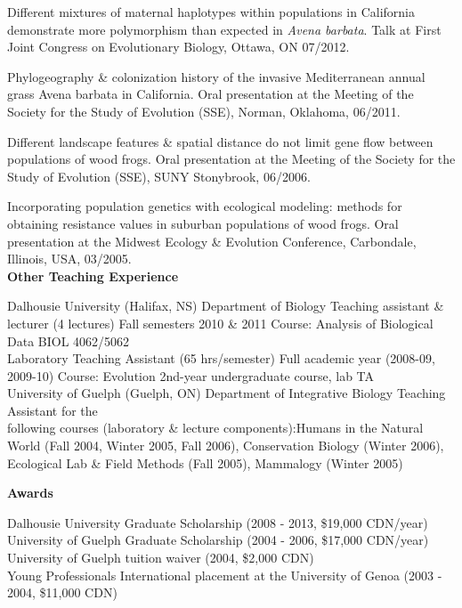 \documentclass[a4paper,12pt,final]{memoir}
\newcommand{\Sep}{\vspace{1.5em}}
\newcommand{\SmallSep}{\vspace{0.5em}}
\newenvironment{Contact Information}
	{\ignorespaces\textbf{\color{MidnightBlue} Contact Information}}
	{\Sep\ignorespacesafterend}
\newcommand{\CVSection}[1]
	{\Large\textbf{#1}\par
	\SmallSep\normalsize\normalfont}
\begin{document}
Different mixtures of maternal haplotypes within populations in California demonstrate more polymorphism than expected in \textit{Avena barbata}. Talk at First Joint Congress on Evolutionary Biology, Ottawa, ON 07/2012.
\SmallSep

Phylogeography \& colonization history of the invasive Mediterranean annual grass Avena barbata in California. Oral presentation at the Meeting of the Society for the Study of Evolution (SSE), Norman, Oklahoma, 06/2011.
\SmallSep

Different landscape features \& spatial distance do not limit gene flow between populations of wood frogs. Oral presentation at the Meeting of the Society for the Study of Evolution (SSE), SUNY Stonybrook, 06/2006.
\SmallSep

Incorporating population genetics with ecological modeling: methods for obtaining resistance values in suburban populations of wood frogs. Oral presentation at the Midwest Ecology \& Evolution Conference, Carbondale, Illinois, USA, 03/2005.\\


\CVSection{Other Teaching Experience}
Dalhousie University (Halifax, NS)
Department of Biology
Teaching assistant \& lecturer (4 lectures)
Fall semesters 2010 \& 2011
Course: Analysis of Biological Data BIOL 4062/5062\\ 

Laboratory Teaching Assistant (65 hrs/semester)
Full academic year (2008-09, 2009-10)
Course: Evolution 
2nd-year undergraduate course, lab TA\\ 

University of Guelph (Guelph, ON)
Department of Integrative Biology 
Teaching Assistant for the\\ following courses (laboratory \& lecture components):Humans in the Natural World (Fall 2004, Winter 2005, Fall 2006), Conservation Biology (Winter 2006), Ecological Lab \& Field Methods (Fall  2005), Mammalogy (Winter 2005)
\Sep


\CVSection{Awards}
Dalhousie University Graduate Scholarship (2008 - 2013, \$19,000 CDN/year)\\
University of Guelph Graduate Scholarship (2004 - 2006, \$17,000 CDN/year)\\
University of Guelph tuition waiver (2004, \$2,000 CDN)\\
Young Professionals International placement at the University of Genoa (2003 - 2004, \$11,000 CDN)\\
\end{document}
